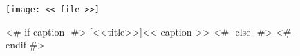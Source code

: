 {%
    \begin{landscape}%
      \begin{figure}
        \vspace{-1in}
        \hspace{-10pt}\begin{minipage}[t]{7.5in}
          \texttt{[image: << file >>]}
        \end{minipage}\hfill
        \hspace{5pt}
        \begin{minipage}[b]{1.5in}
          <# if caption -#>
          [<<title>>]{<< caption >>}
          <#- else -#>
          <#- endif #>\label{fig:<< id >>}
        \end{minipage}
      \end{figure}
    \end{landscape}
}
